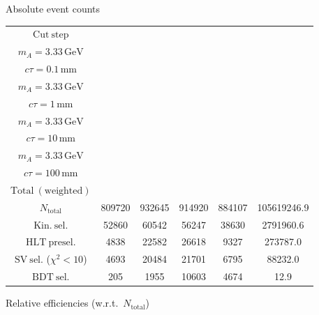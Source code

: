 \documentclass[10pt,a4paper]{article}
\renewcommand{\arraystretch}{1.4}
\begin{document}
{\footnotesize\setlength{\tabcolsep}{4pt}\renewcommand{\arraystretch}{1.05}%
\vspace{12pt}

Absolute event counts

\begin{tabular}{cccccc}
\toprule
$\mathrm{Cut\ step}$ & \shortstack{$m_{\pi}=10\,\mathrm{GeV}$\\$m_{A}=3.33\,\mathrm{GeV}$\\$c\tau=0.1\,\mathrm{mm}$} & \shortstack{$m_{\pi}=10\,\mathrm{GeV}$\\$m_{A}=3.33\,\mathrm{GeV}$\\$c\tau=1\,\mathrm{mm}$} & \shortstack{$m_{\pi}=10\,\mathrm{GeV}$\\$m_{A}=3.33\,\mathrm{GeV}$\\$c\tau=10\,\mathrm{mm}$} & \shortstack{$m_{\pi}=10\,\mathrm{GeV}$\\$m_{A}=3.33\,\mathrm{GeV}$\\$c\tau=100\,\mathrm{mm}$} & \shortstack{$\mathrm{QCD}$\\$\mathrm{Total\ (weighted)}$} \\
\midrule
$N_{\mathrm{total}}$ & 809720 & 932645 & 914920 & 884107 & 105619246.9\\
$\mathrm{Kin.\ sel.}$ & 52860 & 60542 & 56247 & 38630 & 2791960.6\\
$\mathrm{HLT\ presel.}$ & 4838 & 22582 & 26618 & 9327 & 273787.0\\
$\mathrm{SV\ sel.}$ ($\chi^2{<}10$) & 4693 & 20484 & 21701 & 6795 & 88232.0\\
$\mathrm{BDT\ sel.}$ & 205 & 1955 & 10603 & 4674 & 12.9\\
\bottomrule
\end{tabular}

\vspace{18pt}

Relative efficiencies (w.r.t.\ $N_{\mathrm{total}}$)

}
\end{document}
